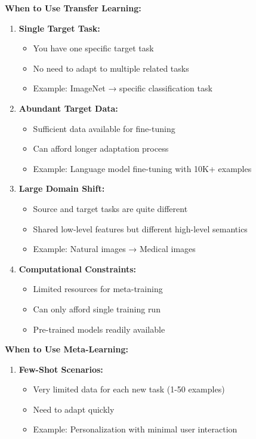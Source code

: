 \documentclass[12pt]{article}
\newcommand{\ieee}[1]{\textcolor{IEEEBlue}{\textbf{#1}}}
\begin{document}
{{			\ieee{When to Use Transfer Learning:}
			
			\begin{enumerate}
				\item \textbf{Single Target Task:}
				\begin{itemize}
					\item You have one specific target task
					\item No need to adapt to multiple related tasks
					\item Example: ImageNet → specific classification task
				\end{itemize}
				
				\item \textbf{Abundant Target Data:}
				\begin{itemize}
					\item Sufficient data available for fine-tuning
					\item Can afford longer adaptation process
					\item Example: Language model fine-tuning with 10K+ examples
				\end{itemize}
				
				\item \textbf{Large Domain Shift:}
				\begin{itemize}
					\item Source and target tasks are quite different
					\item Shared low-level features but different high-level semantics
					\item Example: Natural images → Medical images
				\end{itemize}
				
				\item \textbf{Computational Constraints:}
				\begin{itemize}
					\item Limited resources for meta-training
					\item Can only afford single training run
					\item Pre-trained models readily available
				\end{itemize}
			\end{enumerate}
			
			\ieee{When to Use Meta-Learning:}
			
			\begin{enumerate}
				\item \textbf{Few-Shot Scenarios:}
				\begin{itemize}
					\item Very limited data for each new task (1-50 examples)
					\item Need to adapt quickly
					\item Example: Personalization with minimal user interaction
				\end{itemize}
				

\end{enumerate}}}
\end{document}
